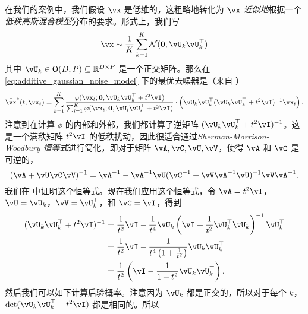 \documentclass[../../book-main_zh.tex]{subfiles}
\begin{document}
在我们的案例中，我们假设 \(\vx\) 是低维的，这粗略地转化为 \(\vx\) \textit{近似地}根据一个\textit{低秩高斯混合模型}分布的要求。形式上，我们写
\begin{equation}\label{eq:MoG1}
	\vx \sim \frac{1}{K}\sum_{k = 1}^{K}\dNorm(\vzero, \vU_{k}\vU_{k}^{\top})
\end{equation}
其中 \(\vU_{k} \in \O(D, P) \subseteq \R^{D \times P}\) 是一个正交矩阵。那么在 \eqref{eq:additive_gaussian_noise_model} 下的最优去噪器是（来自 ）
\begin{equation}
	\bar{\vx}^{\ast}(t, \vx_{t}) = \sum_{k = 1}^{K}\frac{\phi(\vx_{t} ; \vzero,
	\vU_{k}\vU_{k}^{\top} + t^{2}\vI)}{\sum_{i = 1}^{K}\phi(\vx_{t} ; \vzero, \vU_{i}\vU_{i}^{\top} + t^{2}\vI)}\cdot\bp{\vU_{k}\vU_{k}^{\top}(\vU_{k}\vU_{k}^{\top} + t^{2}\vI)^{-1}\vx_{t}}.
\end{equation}
注意到在计算 \(\phi\) 的内部和外部，我们都计算了逆矩阵 \((\vU_{k}\vU_{k}^{\top} + t^{2}\vI)^{-1}\)。这是一个满秩矩阵 \(t^{2}\vI\) 的低秩扰动，因此很适合通过\textit{Sherman-Morrison-Woodbury 恒等式}进行简化，即对于矩阵 \(\vA, \vC, \vU, \vV\)，使得 \(\vA\) 和 \(\vC\) 是可逆的，
\begin{equation}\label{eq:sherman_morrison_woodbury}
	(\vA + \vU\vC\vV)^{-1} = \vA^{-1} - \vA^{-1}\vU(\vC^{-1} + \vV\vA^{-1}\vU)^{-1}\vV\vA^{-1}.
\end{equation}
我们在  中证明这个恒等式。现在我们应用这个恒等式，令 \(\vA = t^{2}\vI\)，\(\vU = \vU_{k}\)，\(\vV = \vU_{k}^{\top}\)，和 \(\vC = \vI\)，得到
\begin{align}
	(\vU_{k}\vU_{k}^{\top} + t^{2}\vI)^{-1} 
	&= \frac{1}{t^{2}}\vI - \frac{1}{t^{4}}\vU_{k}\bp{\vI + \frac{1}{t^{2}}\vU_{k}^{\top}\vU_{k}}^{-1}\vU_{k}^{\top} \\
	&= \frac{1}{t^{2}}\vI - \frac{1}{t^{4}\bp{1 + \frac{1}{t^{2}}}}\vU_{k}\vU_{k}^{\top} \\
	&= \frac{1}{t^{2}}\bp{\vI - \frac{1}{1 + t^{2}}\vU_{k}\vU_{k}^{\top}}.
\end{align}
然后我们可以如下计算后验概率。注意因为 \(\vU_{k}\) 都是正交的，所以对于每个 \(k\)，\(\det(\vU_{k}\vU_{k}^{\top} + t^{2}\vI)\) 都是相同的。所以
\end{document}
